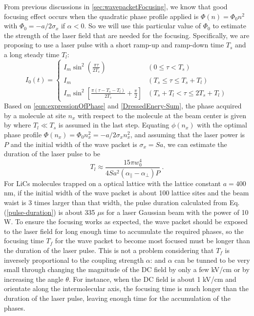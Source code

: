 From previous
discussions in \autoref{sec:wavepacketFocusing}, we know that good focusing effect occurs when the quadratic 
phase profile applied is $\Phi(n) = \Phi_0 n^2$ with $\Phi_0 = -a/2\sigma_x$ if $\alpha<0$. So we will use this
 particular value of $\Phi_0$ to estimate the strength of the laser field that are needed for the focusing.  
Specifically, we are proposing to use a laser pulse with a short ramp-up and
ramp-down time $T_s$ and a long steady time $T_l$:
\begin{equation}
I_0 (t)=\left\{
\begin{array}{ll}
I_{m}\sin^2\left(\frac{\pi\tau}{2 T_{s}}\right) & (0\le \tau<T_s) \\
I_{m} & (T_s \le \tau \le T_s + T_{l}) \\
I_{m}\sin^2\left[\frac{\pi(\tau- T_s - T_{l}) }{2 T_{s}} +
\frac{\pi}{2}\right] & (T_s+ T_{l}<\tau \le 2T_s+ T_{l})
\end{array}
\right. \label{pulse-profile}
\end{equation}
Based on \autoref{eqn:expressionOfPhase} and \autoref{DressedEnery-Sum}, the phase acquired by a molecule
at site $n_x$ with respect to the molecule at the beam center is given by
where $T_{l} \ll T_{s}$ is assumed in the last step. Equating $\phi(n_x)$ with the optimal phase profile 
$\Phi(n_x) = \Phi_0 n_x^2 = -a/2\sigma_x n_x^2$,
and assuming that the laser power is $P$ and the initial width of the wave
packet is $\sigma_x = S a$, we can estimate the
duration of the laser pulse to be
\begin{equation}
T_l \approx \frac{15 \pi
w_0^4}{4 Sa^2(\alpha_{\|}-\alpha_\perp)P} \ .
\label{pulse-duration}
\end{equation}
For LiCs molecules trapped on a optical lattice with the lattice constant $a = 400 $nm, if the initial width of the 
wave packet is about 100 lattice sites and the beam waist is 3 times larger than that width,  the
pulse duration calculated from Eq. (\ref{pulse-duration}) is about
335 $\mu$s for a laser Gaussian beam with the power of 10 W. To ensure the focusing works
as expected, the wave packet should be exposed to the laser field for long enough time to accumulate the required phases, so the focusing time $T_f$ for the wave packet to become
most focused must be longer than the duration of the laser pulse.
This is not a problem considering that $T_f$ is inversely
proportional to the coupling strength $\alpha$:
and $\alpha$ can be tunned to be very small through changing the magnitude of the DC field
\cite{felipe} by only a few kV/cm or by increasing the angle $\theta$. For instance, when the DC field is about 1 kV/cm and orientate along the intermolecular axis,  the focusing time 
is much longer than the duration of the laser pulse, leaving enough time for the accumulation of the phases. 

